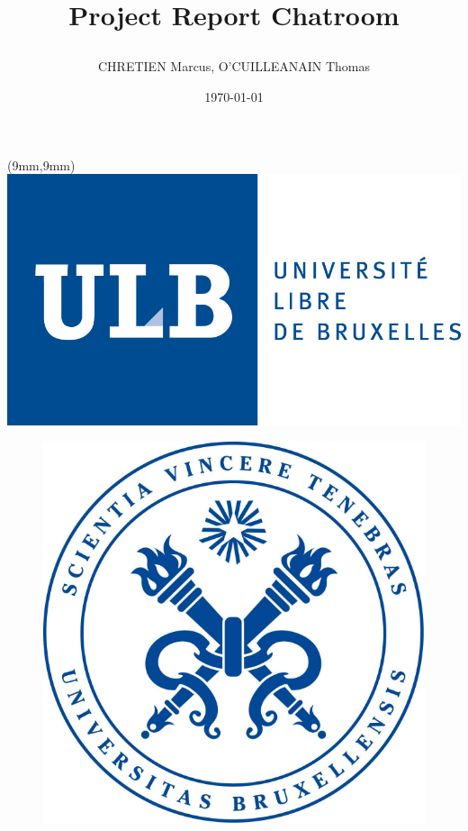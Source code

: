 \documentclass{article}
\begin{document}
\begin{titlepage}
\begin{textblock*}{5cm}(9mm,9mm)
\includegraphics[scale=0.5]{ULB.jpg}
\end{textblock*}
\author{CHRETIEN Marcus, O'CUILLEANAIN Thomas}
\date{\today}
\title{
    \begin{minipage}\linewidth
        \centering
        Project Report
        \vskip10pt
        \large\textbf{Chatroom}
    \end{minipage}
}
\maketitle
\centering
\begin{figure}[H]
  \centering
	\includegraphics[scale=0.4]{SVT.png}
  \label{fig:logo}
\end{figure}
\end{titlepage}
\end{document}
